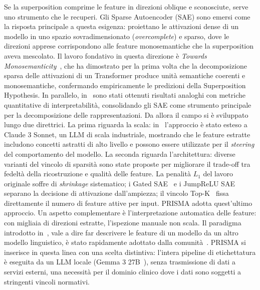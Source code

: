 Se la superposition comprime le feature in direzioni oblique e sconosciute, serve uno strumento che le recuperi. Gli Sparse Autoencoder (SAE) sono emersi come la risposta principale a questa esigenza: proiettano le attivazioni dense di un modello in uno spazio sovradimensionato (\textit{overcomplete}) e sparso, dove le direzioni apprese corrispondono alle feature monosemantiche che la superposition aveva mescolato.
Il lavoro fondativo in questa direzione è \textit{Towards Monosemanticity}~\parencite{bricken2023monosemanticity}, che ha dimostrato per la prima volta che la decomposizione sparsa delle attivazioni di un Transformer produce unità semantiche coerenti e monosemantiche, confermando empiricamente le predizioni della Superposition Hypothesis. In parallelo, in~\parencite{cunningham2023sparse} sono stati ottenuti risultati analoghi con metriche quantitative di interpretabilità, consolidando gli SAE come strumento principale per la decomposizione delle rappresentazioni.
Da allora il campo si è sviluppato lungo due direttrici. La prima riguarda la scala: in~\parencite{templeton2024scaling} l'approccio è stato esteso a Claude 3 Sonnet, un LLM di scala industriale, mostrando che le feature estratte includono concetti astratti di alto livello e possono essere utilizzate per il \textit{steering} del comportamento del modello. La seconda riguarda l'architettura: diverse varianti del vincolo di sparsità sono state proposte per migliorare il trade-off tra fedeltà della ricostruzione e qualità delle feature. La penalità $L_1$ del lavoro originale soffre di \textit{shrinkage} sistematico; i Gated SAE~\parencite{rajamanoharan2024improving} e i JumpReLU SAE~\parencite{rajamanoharan2024jumping} separano la decisione di attivazione dall'ampiezza; il vincolo Top-K~\parencite{gao2024scaling} fissa direttamente il numero di feature attive per input. PRISMA adotta quest'ultimo approccio.
Un aspetto complementare è l'interpretazione automatica delle feature: con migliaia di direzioni estratte, l'ispezione manuale non scala. Il paradigma introdotto in~\parencite{bills2023language}, vale a dire far descrivere le feature di un modello da un altro modello linguistico, è stato rapidamente adottato dalla comunità~\parencite{bricken2023monosemanticity, templeton2024scaling}. PRISMA si inserisce in questa linea con una scelta distintiva: l'intera pipeline di etichettatura è eseguita da un LLM locale (Gemma 3 27B~\parencite{gemma3report}), senza trasmissione di dati a servizi esterni, una necessità per il dominio clinico dove i dati sono soggetti a stringenti vincoli normativi.
